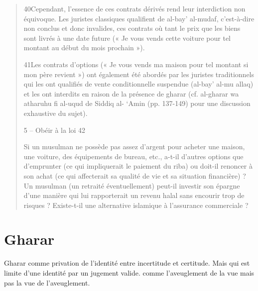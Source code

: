 \begin{quote}
40Cependant, l’essence de ces contrats dérivés rend leur interdiction non équivoque. Les juristes classiques qualifient de al-bay’ al-mudaf, c’est-à-dire non conclus et donc invalides, ces contrats où tant le prix que les biens sont livrés à une date future (« Je vous vends cette voiture pour tel montant au début du mois prochain »).

41Les contrats d’options (« Je vous vends ma maison pour tel montant si mon père revient ») ont également été abordés par les juristes traditionnels qui les ont qualifiés de vente conditionnelle suspendue (al-bay’ al-mu allaq) et les ont interdits en raison de la présence de gharar (cf. al-gharar wa atharuhu fi al-uqud de Siddiq al- ‘Amin (pp. 137-149) pour une discussion exhaustive du sujet).

5 – Obéir à la loi
42

Si un musulman ne possède pas assez d’argent pour acheter une maison, une voiture, des équipements de bureau, etc., a-t-il d’autres options que d’emprunter (ce qui impliquerait le paiement du riba) ou doit-il renoncer à son achat (ce qui affecterait sa qualité de vie et sa situation financière) ?
Un musulman (un retraité éventuellement) peut-il investir son épargne d’une manière qui lui rapporterait un revenu halal sans encourir trop de risques ?
Existe-t-il une alternative islamique à l’assurance commerciale ?\end{quote}


\section{Gharar}

Gharar comme privation de l'identité entre incertitude et certitude. Mais qui est limite d'une identité par un jugement valide. 
comme l'aveuglement de la vue mais pas la vue de l'aveuglement.



